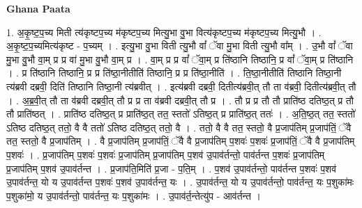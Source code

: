\documentclass[17pt]{extarticle}
\begin{document}
\textbf{Ghana Paata } \newline

1. अ॒कृ॒ष्ट॒प॒च्य मिती त्य॑कृष्टप॒च्य म॑कृष्टप॒च्य मित्यु॒भा वु॒भा वित्य॑कृष्टप॒च्य म॑कृष्टप॒च्य मित्यु॒भौ । . अ॒कृ॒ष्ट॒प॒च्यमित्य॑कृष्ट - प॒च्यम् । . इत्यु॒भा वु॒भा विती त्यु॒भौ वां᳚ ॅवा मु॒भा विती त्यु॒भौ वा᳚म् । . उ॒भौ वां᳚ ॅवा मु॒भा वु॒भौ वा॒म् प्र प्र वा॑ मु॒भा वु॒भौ वा॒म् प्र । . वा॒म् प्र प्र वां᳚ ॅवा॒म् प्र ति॑ष्ठानि तिष्ठानि॒ प्र वां᳚ ॅवा॒म् प्र ति॑ष्ठानि । . प्र ति॑ष्ठानि तिष्ठानि॒ प्र प्र ति॑ष्ठा॒नीतीति॑ तिष्ठानि॒ प्र प्र ति॑ष्ठा॒नीति॑ । . ति॒ष्ठा॒नीतीति॑ तिष्ठानि तिष्ठा॒नी त्य॑ब्रवी दब्रवी॒ दिति॑ तिष्ठानि तिष्ठा॒नी त्य॑ब्रवीत् । . इत्य॑ब्रवी दब्रवी॒ दितीत्य॑ब्रवी॒त् तौ ता व॑ब्रवी॒ दितीत्य॑ब्रवी॒त् तौ । . अ॒ब्र॒वी॒त् तौ ता व॑ब्रवी दब्रवी॒त् तौ प्र प्र ता व॑ब्रवी दब्रवी॒त् तौ प्र । . तौ प्र प्र तौ तौ प्राति॑ष्ठ दतिष्ठ॒त् प्र तौ तौ प्राति॑ष्ठत् । . प्राति॑ष्ठ दतिष्ठ॒त् प्र प्राति॑ष्ठ॒त् तत॒ स्ततो॑ ऽतिष्ठ॒त् प्र प्राति॑ष्ठ॒त् ततः॑ । . अ॒ति॒ष्ठ॒त् तत॒ स्ततो॑ ऽतिष्ठ दतिष्ठ॒त् ततो॒ वै वै ततो॑ ऽतिष्ठ दतिष्ठ॒त् ततो॒ वै । . ततो॒ वै वै तत॒ स्ततो॒ वै प्र॒जाप॑तिम् प्र॒जाप॑तिं॒ ॅवै तत॒ स्ततो॒ वै प्र॒जाप॑तिम् । . वै प्र॒जाप॑तिम् प्र॒जाप॑तिं॒ ॅवै वै प्र॒जाप॑तिम् प॒शवः॑ प॒शवः॑ प्र॒जाप॑तिं॒ ॅवै वै प्र॒जाप॑तिम् प॒शवः॑ । . प्र॒जाप॑तिम् प॒शवः॑ प॒शवः॑ प्र॒जाप॑तिम् प्र॒जाप॑तिम् प॒शव॑ उ॒पाव॑र्तन्तो॒ पाव॑र्तन्त प॒शवः॑ प्र॒जाप॑तिम् प्र॒जाप॑तिम् प॒शव॑ उ॒पाव॑र्तन्त । . प्र॒जाप॑ति॒मिति॑ प्र॒जा - प॒ति॒म् । . प॒शव॑ उ॒पाव॑र्तन्तो॒ पाव॑र्तन्त प॒शवः॑ प॒शव॑ उ॒पाव॑र्तन्त॒ यो य उ॒पाव॑र्तन्त प॒शवः॑ प॒शव॑ उ॒पाव॑र्तन्त॒ यः । . उ॒पाव॑र्तन्त॒ यो य उ॒पाव॑र्तन्तो॒ पाव॑र्तन्त॒ यः प॒शुका॑मः प॒शुका॑मो॒ य उ॒पाव॑र्तन्तो॒ पाव॑र्तन्त॒ यः प॒शुका॑मः । . उ॒पाव॑र्त॒न्तेत्यु॑प - आव॑र्तन्त । \newline
\end{document}
